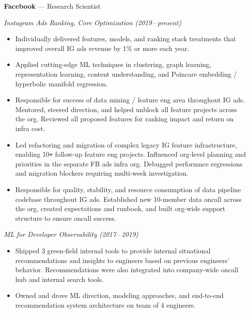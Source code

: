 \documentclass[10pt,letterpaper]{article}
\newcommand{\dates}[1]{\item[#1\hfill]}
\newcommand{\jobhead}[3]{{\dates{#1}{\bf #2} --- {#3}}}
\newcommand{\jobsubhead}[2]{{{\it #2 (#1)}}}
\newenvironment{jobs}
  {\leftmargini=24.1mm%
   \begin{list}%
    {}
    {\setlength\labelwidth{22mm}\itemsep=1.5mm}}
  {\end{list}}
\begin{document}
\begin{jobs}

\jobhead{2017\,--\,present} {Facebook}{Research Scientist}

\jobsubhead{2019\,--\,present}{Instagram Ads Ranking, Core Optimization}

\begin{itemize}
\item Individually delivered features, models, and ranking stack treatments that improved
	overall IG ads revenue by 1\% or more each year.

\item Applied cutting-edge ML techniques in clustering, graph learning, representation learning,
	content understanding, and Poincare embedding / hyperbolic manifold regression.

\item Responsible for success of data mining / feature eng area throughout IG ads. Mentored, steered
	direction, and helped unblock all feature projects across the org.
	Reviewed all proposed features for ranking impact and return on infra cost.

\item Led refactoring and migration of complex legacy IG feature infrastructure,
	enabling 10\verb!+! follow-up feature eng projects.
	Influenced org-level planning and priorities
	in the separate FB ads infra org. Debugged
	performnce regressions and migration blockers requiring multi-week investigation.

\item Responsible for quality, stability, and resource consumption of data
	pipeline codebase throughout IG ads. Established new 10-member data oncall across the
	org, created expectations and runbook, and built org-wide support structure
	to ensure oncall success.

\end{itemize}

\jobsubhead{2017\,--\,2019}{ML for Developer Observability}
\begin{itemize}

\item Shipped 3 green-field internal tools to provide internal situational
	recommendations and insights to engineers based on previous
	engineers' behavior. Recommendations were also integrated into company-wide oncall hub and
	internal search tools.

\item Owned and drove ML direction, modeling approaches, and end-to-end
	recommendation system architecture on team of 4 engineers.


\end{itemize}
\end{jobs}
\end{document}
